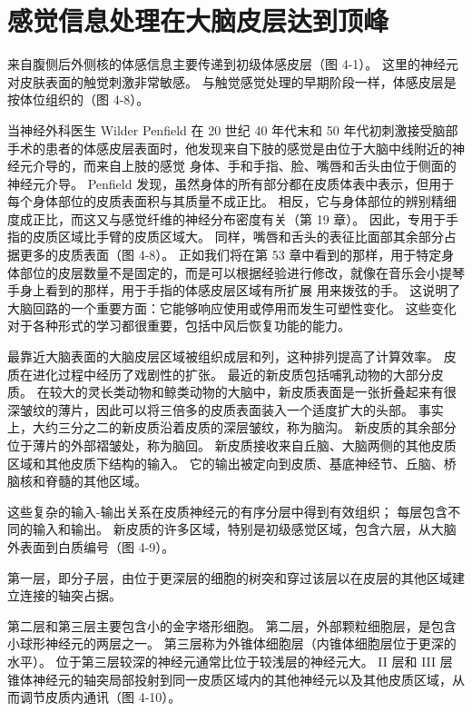 \section{感觉信息处理在大脑皮层达到顶峰}

来自腹侧后外侧核的体感信息主要传递到初级体感皮层（图 4-1）。 这里的神经元对皮肤表面的触觉刺激非常敏感。 与触觉感觉处理的早期阶段一样，体感皮层是按体位组织的（图 4-8）。

当神经外科医生 Wilder Penfield 在 20 世纪 40 年代末和 50 年代初刺激接受脑部手术的患者的体感皮层表面时，他发现来自下肢的感觉是由位于大脑中线附近的神经元介导的，而来自上肢的感觉 身体、手和手指、脸、嘴唇和舌头由位于侧面的神经元介导。 Penfield 发现，虽然身体的所有部分都在皮质体表中表示，但用于每个身体部位的皮质表面积与其质量不成正比。 相反，它与身体部位的辨别精细度成正比，而这又与感觉纤维的神经分布密度有关（第 19 章）。 因此，专用于手指的皮质区域比手臂的皮质区域大。 同样，嘴唇和舌头的表征比面部其余部分占据更多的皮质表面（图 4-8）。 正如我们将在第 53 章中看到的那样，用于特定身体部位的皮层数量不是固定的，而是可以根据经验进行修改，就像在音乐会小提琴手身上看到的那样，用于手指的体感皮层区域有所扩展 用来拨弦的手。 这说明了大脑回路的一个重要方面：它能够响应使用或停用而发生可塑性变化。 这些变化对于各种形式的学习都很重要，包括中风后恢复功能的能力。

最靠近大脑表面的大脑皮层区域被组织成层和列，这种排列提高了计算效率。 皮质在进化过程中经历了戏剧性的扩张。 最近的新皮质包括哺乳动物的大部分皮质。 在较大的灵长类动物和鲸类动物的大脑中，新皮质表面是一张折叠起来有很深皱纹的薄片，因此可以将三倍多的皮质表面装入一个适度扩大的头部。 事实上，大约三分之二的新皮质沿着皮质的深层皱纹，称为脑沟。 新皮质的其余部分位于薄片的外部褶皱处，称为脑回。 新皮质接收来自丘脑、大脑两侧的其他皮质区域和其他皮质下结构的输入。 它的输出被定向到皮质、基底神经节、丘脑、桥脑核和脊髓的其他区域。

这些复杂的输入-输出关系在皮质神经元的有序分层中得到有效组织； 每层包含不同的输入和输出。 新皮质的许多区域，特别是初级感觉区域，包含六层，从大脑外表面到白质编号（图 4-9）。

第一层，即分子层，由位于更深层的细胞的树突和穿过该层以在皮层的其他区域建立连接的轴突占据。

第二层和第三层主要包含小的金字塔形细胞。 第二层，外部颗粒细胞层，是包含小球形神经元的两层之一。 第三层称为外锥体细胞层（内锥体细胞层位于更深的水平）。 位于第三层较深的神经元通常比位于较浅层的神经元大。 II 层和 III 层锥体神经元的轴突局部投射到同一皮质区域内的其他神经元以及其他皮质区域，从而调节皮质内通讯（图 4-10）。

